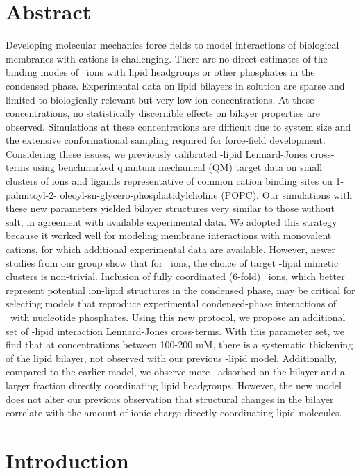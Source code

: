\section{Abstract}
Developing molecular mechanics force fields to model interactions of biological
membranes with \mg{} cations is challenging. There are no direct estimates of the
binding modes of \mg~ions with lipid headgroups or other phosphates in the condensed
phase. Experimental data on lipid bilayers in \mg{} solution are sparse and limited
to biologically relevant but very low ion concentrations. At these concentrations, no
statistically discernible effects on bilayer properties are observed.
Simulations at these concentrations are difficult due to system size and the extensive conformational
sampling required for force-field development.
Considering these issues, we previously calibrated \mg-lipid Lennard-Jones cross-terms
using benchmarked quantum mechanical (QM) target data on small clusters of ions and
ligands representative of common cation binding sites on 1-palmitoyl-2-
oleoyl-sn-glycero-phosphatidylcholine (POPC). Our
simulations with these new \mg{} parameters yielded bilayer structures very similar
to those without salt, in agreement with available experimental data. 
We adopted this strategy because it worked well for modeling
membrane interactions with monovalent cations, for which additional experimental
data are available. However, newer studies from our group show that for \mg~ions,
the choice of target \mg-lipid mimetic clusters is non-trivial. Inclusion of fully
coordinated (6-fold) \mg~ions, which better represent potential ion-lipid structures
in the condensed phase, may be critical for selecting models that reproduce
experimental condensed-phase interactions of \mg~with nucleotide phosphates.
Using this new protocol, we propose an additional set of \mg-lipid interaction
Lennard-Jones cross-terms. With this parameter set, we find that at concentrations 
between 100-200 mM, there is a systematic thickening of the lipid bilayer, not observed
with our previous \mg-lipid model. Additionally, compared to the earlier model, we
observe more \mg~adsorbed on the bilayer and a larger fraction directly
coordinating lipid headgroups. However, the new model does not alter our previous
observation that structural changes in the bilayer correlate with the amount of
ionic charge directly coordinating lipid molecules.


\section{Introduction}

